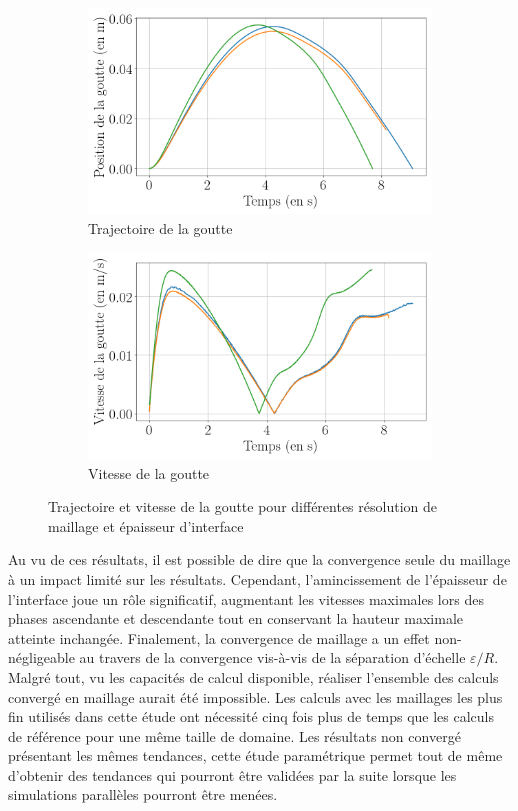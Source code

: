 \begin{figure}[H] 
	\centering
	\begin{subfigure}[H]{0.47\textwidth}
		\centering
		\includegraphics[width=\textwidth]{figure/influence_maillage_position.png}
		\caption{Trajectoire de la goutte}
	\end{subfigure} 
	\begin{subfigure}[H]{0.47\textwidth}
		\centering
		\includegraphics[width=\textwidth]{figure/influence_maillage_vitesse.png}
		\caption{Vitesse de la goutte}
	\end{subfigure}
	\caption{Trajectoire et vitesse de la goutte pour différentes résolution de maillage et épaisseur d'interface}
\label{fig:influencemesh}
\end{figure}
Au vu de ces résultats, il est possible de dire que la convergence seule du maillage à un impact limité sur les résultats. Cependant, l'amincissement de l'épaisseur de l'interface joue un rôle significatif, augmentant les vitesses maximales lors des phases ascendante et descendante tout en conservant la hauteur maximale atteinte inchangée. Finalement, la convergence de maillage a un effet non-négligeable au travers de la convergence vis-à-vis de la séparation d'échelle $\varepsilon/R$. Malgré tout, vu les capacités de calcul disponible, réaliser l'ensemble des calculs convergé en maillage aurait été impossible. Les calculs avec les maillages les plus fin utilisés dans cette étude ont nécessité cinq fois plus de temps que les calculs de référence pour une même taille de domaine. Les résultats non convergé présentant les mêmes tendances, cette étude paramétrique permet tout de même d'obtenir des tendances qui pourront être validées par la suite lorsque les simulations parallèles pourront être menées.

